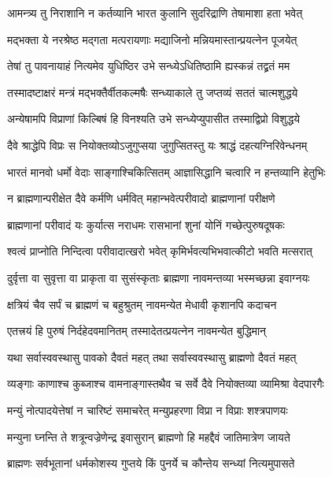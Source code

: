 \twolineshloka
{आमन्त्र्य तु निराशानि न कर्तव्यानि भारत}
{कुलानि सुदरिद्राणि तेषामाशा हता भवेत्}


\twolineshloka
{मद्भक्ता ये नरश्रेष्ठ मद्गता मत्परायणाः}
{मद्याजिनो मन्नियमास्तान्प्रयत्नेन पूजयेत्}


\twolineshloka
{तेषां तु पावनायाहं नित्यमेव युधिष्ठिर}
{उभे सन्ध्येऽधितिष्ठामि ह्यस्कन्नं तद्व्रतं मम}


\twolineshloka
{तस्मादष्टाक्षरं मन्त्रं मद्भक्तैर्वीतकल्मषैः}
{सन्ध्याकाले तु जप्तव्यं सततं चात्मशुद्धये}


\threelineshloka
{अन्येषामपि विप्राणां किल्बिषं हि विनश्यति}
{उभे सन्ध्येप्युपासीत तस्माद्विप्रो विशुद्धये}
{}


\twolineshloka
{दैवे श्राद्धेपि विप्रः स नियोक्तव्योऽजुगुप्सया}
{जुगुप्सितस्तु यः श्राद्धं दहत्यग्निरिवेन्धनम्}


\twolineshloka
{भारतं मानवो धर्मो वेदाः साङ्गाश्चिकित्सितम्}
{आज्ञासिद्धानि चत्वारि न हन्तव्यानि हेतुभिः}


\twolineshloka
{न ब्राह्मणान्परीक्षेत दैवे कर्मणि धर्मवित्}
{महान्भवेत्परीवादो ब्राह्मणानां परीक्षणे}


\twolineshloka
{ब्राह्मणानां परीवादं यः कुर्यात्स नराधमः}
{रासभानां शुनां योनिं गच्छेत्पुरुषदूषकः}


\twolineshloka
{श्वत्वं प्राप्नोति निन्दित्वा परीवादात्खरो भवेत्}
{कृमिर्भवत्यभिभवात्कीटो भवति मत्सरात्}


\twolineshloka
{दुर्वृत्ता वा सुवृत्ता वा प्राकृता वा सुसंस्कृताः}
{ब्राह्मणा नावमन्तव्या भस्मच्छन्ना इवाग्नयः}


\twolineshloka
{क्षत्रियं चैव सर्पं च ब्राह्मणं च बहुश्रुतम्}
{नावमन्येत मेधावी कृशानपि कदाचन}


\twolineshloka
{एतत्त्रयं हि पुरुषं निर्दहेदवमानितम्}
{तस्मादेतत्प्रयत्नेन नावमन्येत बुद्धिमान्}


\twolineshloka
{यथा सर्वास्ववस्थासु पावको दैवतं महत्}
{तथा सर्वास्ववस्थासु ब्राह्मणो दैवतं महत्}


\twolineshloka
{व्यङ्गाः काणाश्च कुब्जाश्च वामनाङ्गास्तथैव च}
{सर्वे दैवे नियोक्तव्या व्यामिश्रा वेदपारगैः}


\twolineshloka
{मन्युं नोत्पादयेत्तेषां न चारिष्टं समाचरेत्}
{मन्युप्रहरणा विप्रा न विप्राः शश्त्रपाणयः}


\twolineshloka
{मन्युना घ्नन्ति ते शत्रून्वज्रेणेन्द्र इवासुरान्}
{ब्राह्मणो हि महद्दैवं जातिमात्रेण जायते}


\twolineshloka
{ब्राह्मणः सर्वभूतानां धर्मकोशस्य गुप्तये}
{किं पुनर्ये च कौन्तेय सन्ध्यां नित्यमुपासते}



